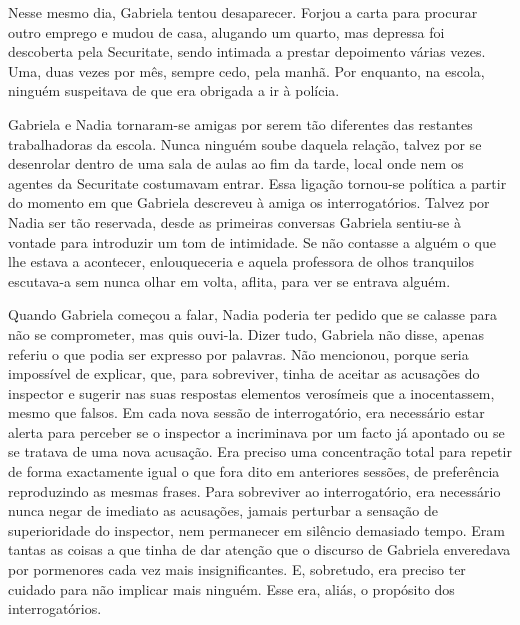 Nesse mesmo dia, Gabriela tentou desaparecer. Forjou a carta para
procurar outro emprego e mudou de casa, alugando um quarto, mas depressa
foi descoberta pela Securitate, sendo intimada a prestar depoimento
várias vezes. Uma, duas vezes por mês, sempre cedo, pela manhã. Por
enquanto, na escola, ninguém suspeitava de que era obrigada a ir à
polícia.

Gabriela e Nadia tornaram-se amigas por serem tão diferentes das
restantes trabalhadoras da escola. Nunca ninguém soube daquela relação,
talvez por se desenrolar dentro de uma sala de aulas ao fim da tarde,
local onde nem os agentes da Securitate costumavam entrar. Essa ligação
tornou-se política a partir do momento em que Gabriela descreveu à amiga
os interrogatórios. Talvez por Nadia ser tão reservada, desde as
primeiras conversas Gabriela sentiu-se à vontade para introduzir um tom de intimidade. Se não contasse a
alguém o que lhe estava a acontecer, enlouqueceria e aquela professora
de olhos tranquilos escutava-a sem nunca olhar em volta, aflita, para
ver se entrava alguém.

Quando Gabriela começou a falar, Nadia poderia ter pedido que se calasse
para não se comprometer, mas quis ouvi-la. Dizer tudo, Gabriela não
disse, apenas referiu o que
podia ser expresso por palavras. Não mencionou, porque seria impossível
de explicar, que, para sobreviver, tinha de aceitar as acusações do
inspector e sugerir nas suas respostas elementos verosímeis que a
inocentassem, mesmo que falsos. Em cada nova sessão de interrogatório,
era necessário estar alerta para perceber se o inspector a incriminava
por um facto já apontado ou se se tratava de uma nova acusação. Era
preciso uma concentração total para repetir de forma exactamente igual o
que fora dito em anteriores sessões, de preferência reproduzindo as
mesmas frases. Para sobreviver ao interrogatório, era necessário nunca
negar de imediato as acusações, jamais perturbar a sensação de
superioridade do inspector, nem permanecer em silêncio demasiado tempo.
Eram tantas as coisas a que tinha de dar atenção que o discurso de
Gabriela enveredava por pormenores cada vez mais insignificantes. E,
sobretudo, era preciso ter cuidado para não implicar mais ninguém.
Esse era, aliás, o propósito dos interrogatórios.

